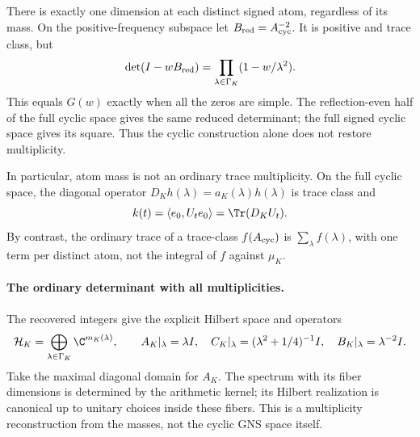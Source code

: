 There is exactly one dimension at each distinct signed atom,
regardless of its mass. On the positive-frequency subspace let
\(B_{\rm red}=A_{\rm cyc}^{-2}\). It is positive and trace class, but
\[
 \det(I-wB_{\rm red})
 =\prod_{\lambda\in\Gamma_K}(1-w/\lambda^2).
\]
This equals \(G(w)\) exactly when all the zeros are simple.
The reflection-even half of the full cyclic space gives the same
reduced determinant; the full signed cyclic space gives its square.
Thus the cyclic construction alone does not restore multiplicity.

In particular, atom mass is not an ordinary trace multiplicity.
On the full cyclic space, the diagonal operator
\(D_Kh(\lambda)=a_K(\lambda)h(\lambda)\) is trace class and
\[
 k(t)=\langle e_0,U_te_0\rangle
     =\Tr(D_KU_t).
\]
By contrast, the ordinary trace of a trace-class \(f(A_{\rm cyc})\)
is \(\sum_{\lambda}f(\lambda)\), with one term per distinct atom,
not the integral of \(f\) against \(\mu_K\).

\paragraph{The ordinary determinant with all multiplicities.}
The recovered integers give the explicit Hilbert space and operators
\[
 \mathcal H_K=\bigoplus_{\lambda\in\Gamma_K}\C^{m_K(\lambda)},
 \qquad A_K|_\lambda=\lambda I,\quad
 C_K|_\lambda=(\lambda^2+1/4)^{-1}I,\quad
 B_K|_\lambda=\lambda^{-2}I.
\]
Take the maximal diagonal domain for \(A_K\). The spectrum with its
fiber dimensions is determined by the arithmetic kernel; its Hilbert
realization is canonical up to unitary choices inside these fibers.
This is a multiplicity reconstruction from the masses, not the cyclic
GNS space itself.

